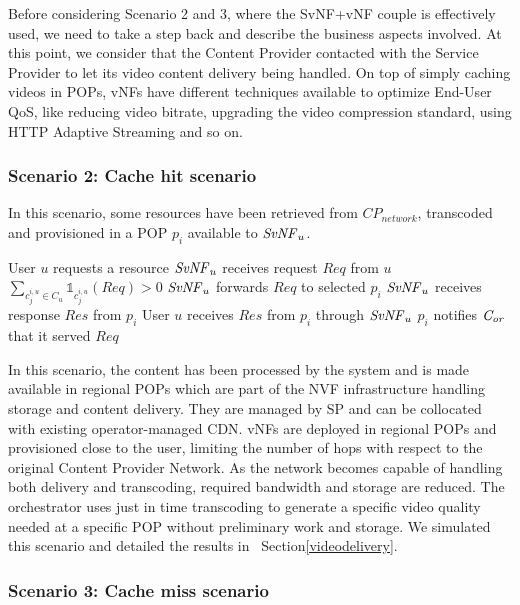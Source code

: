 Before considering Scenario 2 and 3, where the SvNF+vNF couple is effectively used, we need to take a step back and describe the business aspects involved. At this point, we consider that the Content Provider contacted with the Service Provider to let its video content delivery being handled. On top of simply caching videos in POPs, vNFs have different techniques available to optimize End-User QoS, like reducing video bitrate, upgrading the video compression standard, using HTTP Adaptive Streaming and so on.

\subsubsection*{Scenario 2: Cache hit scenario}

In this scenario, some resources have been retrieved from \(\mathit{CP}_{\mathit{network}}\), transcoded and provisioned in a POP $p_{i}$ available to $\mathit{SvNF}_{u}$.

\begin{algorithmic}[1]
	\STATE User $u$ requests a resource
\STATE $\mathit{SvNF}_{u}$ receives request $\mathit{Req}$ from $u$
\STATE \( \sum_{c^{i,u}_{j}\in C_{u}}{\mathbb{1}_{c^{i,u}_{j}}(\mathit{Req})}>0\)
\STATE $\mathit{SvNF}_{u}$ forwards $\mathit{Req}$ to selected $p_{i}$
\STATE $\mathit{SvNF}_{u}$ receives response $\mathit{Res}$ from $p_{i}$
\STATE User $u$ receives $\mathit{Res}$ from $p_{i}$ through $\mathit{SvNF}_{u}$
\STATE $p_{i}$ notifies $\mathit{C_{or}}$ that it served  $\mathit{Req}$
\end{algorithmic}


In this scenario, the content has been processed by the system and is made available in regional POPs which are part of the NVF infrastructure handling storage and content delivery.
They are managed by SP and can be collocated with existing operator-managed CDN.
vNFs are deployed in regional POPs and provisioned close to the user, limiting the number of hops with respect to the original Content Provider Network.
As the network becomes capable of handling both delivery and transcoding, required bandwidth and storage are reduced. The orchestrator uses just in time transcoding to generate a specific video quality needed at a specific POP without preliminary work and storage.
We simulated this scenario and detailed the results in ~Section\ref{videodelivery}.

\subsubsection*{Scenario 3: Cache miss scenario}

